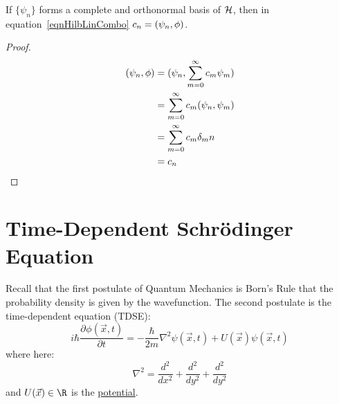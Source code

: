 \documentclass[../Main.tex]{subfiles}
\begin{document}
\begin{lemma}
    If $\{\psi_n\}$ forms a complete and orthonormal basis of $\mathcal{H}$, then  in equation~\ref{eqnHilbLinCombo} $c_n = (\psi_n,\phi)$.
    \label{lemLinComboCoeffts}
\end{lemma}
\begin{proof}
    \begin{align*}
        (\psi_n,\phi) 
        &= (\psi_n,\sum_{m = 0}^\infty c_m \psi_m) \\
        &= \sum_{m = 0}^{\infty}c_m (\psi_n,\psi_m) \\
        &= \sum_{m = 0}^{\infty} c_m \delta_mn \\
        &= c_n
    \end{align*}
\end{proof}
\section{Time-Dependent Schr\texorpdfstring{\"o}{o}dinger Equation}
Recall that the first postulate of Quantum Mechanics is Born's Rule that the probability density is given by the wavefunction. The second postulate is the time-dependent \schr equation (TDSE):
\begin{equation}
    i\hbar \frac{\partial^{}\phi(\vec{x}, t)}{\partial t^{}} = -\frac{\hbar}{2m}\nabla^2 \psi(\vec{x}, t) + U(\vec{x})\psi(\vec{x}, t)
    \label{eqnTDSE}
\end{equation}
where here:
\begin{equation*}
    \nabla^2 = \frac{d^2}{dx^2} + \frac{d^2}{dy^2} + \frac{d^2}{dy^2}
\end{equation*}
and $U(\vec{x}) \in \R$ is the \underline{potential}.
\end{document}
